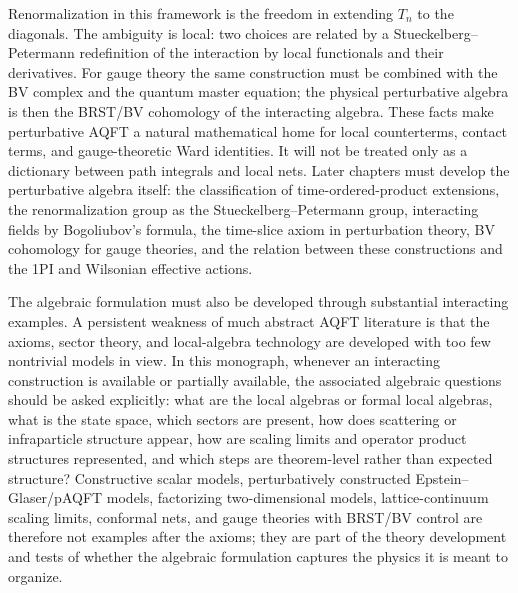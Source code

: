 Renormalization in this framework is the freedom in extending \(T_n\) to the
diagonals.  The ambiguity is local: two choices are related by a
Stueckelberg--Petermann redefinition of the interaction by local functionals
and their derivatives.  For gauge theory the same construction must be
combined with the BV complex and the quantum master equation; the physical
perturbative algebra is then the BRST/BV cohomology of the interacting
algebra.  These facts make perturbative AQFT a natural mathematical home for
local counterterms, contact terms, and gauge-theoretic Ward identities.  It
will not be treated only as a dictionary between path integrals and local
nets.  Later chapters must develop the perturbative algebra itself: the
classification of time-ordered-product extensions, the renormalization group
as the Stueckelberg--Petermann group, interacting fields by Bogoliubov's
formula, the time-slice axiom in perturbation theory, BV cohomology for gauge
theories, and the relation between these constructions and the 1PI and
Wilsonian effective actions.

The algebraic formulation must also be developed through substantial
interacting examples.  A persistent weakness of much abstract AQFT literature
is that the axioms, sector theory, and local-algebra technology are developed
with too few nontrivial models in view.  In this monograph, whenever an
interacting construction is available or partially available, the associated
algebraic questions should be asked explicitly: what are the local algebras or
formal local algebras, what is the state space, which sectors are present, how
does scattering or infraparticle structure appear, how are scaling limits and
operator product structures represented, and which steps are theorem-level
rather than expected structure?  Constructive scalar models, perturbatively
constructed Epstein--Glaser/pAQFT models, factorizing two-dimensional models,
lattice-continuum scaling limits, conformal nets, and gauge theories with
BRST/BV control are therefore not examples after the axioms; they are part of
the theory development and tests of whether the algebraic formulation captures
the physics it is meant to organize.

